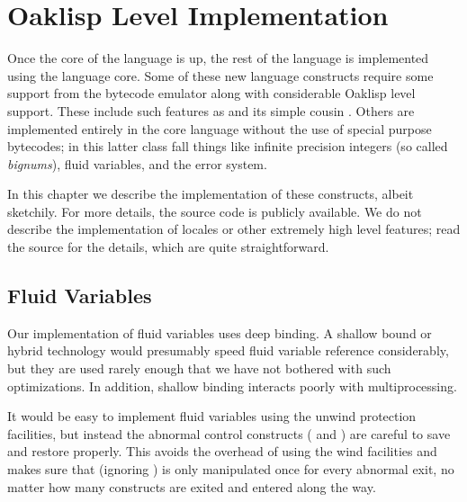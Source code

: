 \chapter{Oaklisp Level Implementation}

Once the core of the language is up, the rest of the language is
implemented using the language core.  Some of these new language
constructs require some support from the bytecode emulator along with
considerable Oaklisp level support.  These include such features as
 and its simple cousin .  Others are implemented
entirely in the core language without the use of special purpose
bytecodes; in this latter class fall things like infinite precision
integers (so called \emph{bignums}), fluid variables, and the error
system.

In this chapter we describe the implementation of these constructs,
albeit sketchily.  For more details, the source code is publicly
available.  We do not describe the implementation of locales or other
extremely high level features; read the source for the details, which
are quite straightforward.


\section{Fluid Variables} \label{fluid-impl}

Our implementation of fluid variables uses deep binding.  A shallow
bound or hybrid technology would presumably speed fluid variable
reference considerably, but they are used rarely enough that we have
not bothered with such optimizations.  In addition, shallow binding
interacts poorly with multiprocessing.


It would be easy to implement fluid variables using the unwind
protection facilities, but instead the abnormal control constructs
( and ) are careful to save and restore
 properly.  This avoids the overhead of using
the wind facilities and makes sure that (ignoring )
 is only manipulated once for every abnormal
exit, no matter how many  constructs are exited and entered
along the way.





